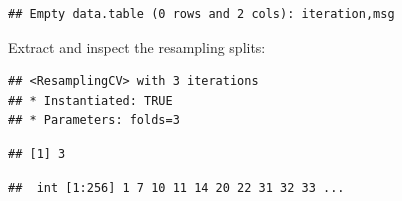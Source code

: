 \documentclass[]{scrbook}
\newenvironment{Shaded}{\begin{snugshade}}{\end{snugshade}}
\newcommand{\DecValTok}[1]{\textcolor[rgb]{0.00,0.00,0.81}{#1}}
\newcommand{\KeywordTok}[1]{\textcolor[rgb]{0.13,0.29,0.53}{\textbf{#1}}}
\newcommand{\NormalTok}[1]{#1}
\newcommand{\OperatorTok}[1]{\textcolor[rgb]{0.81,0.36,0.00}{\textbf{#1}}}
\renewenvironment{Shaded} {\begin{snugshade}\small} {\end{snugshade}}
\begin{document}
\begin{Shaded}
\end{Shaded}

\begin{verbatim}
## Empty data.table (0 rows and 2 cols): iteration,msg
\end{verbatim}

Extract and inspect the resampling splits:

\begin{Shaded}
\end{Shaded}

\begin{verbatim}
## <ResamplingCV> with 3 iterations
## * Instantiated: TRUE
## * Parameters: folds=3
\end{verbatim}

\begin{Shaded}
\end{Shaded}

\begin{verbatim}
## [1] 3
\end{verbatim}

\begin{Shaded}
\end{Shaded}

\begin{verbatim}
##  int [1:256] 1 7 10 11 14 20 22 31 32 33 ...
\end{verbatim}

\begin{Shaded}
\end{Shaded}
\end{document}
